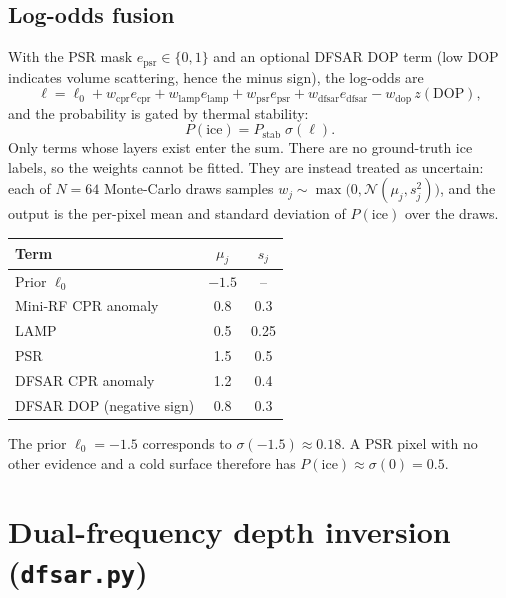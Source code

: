 \documentclass[11pt,a4paper]{article}
\newcommand{\code}[1]{\texttt{#1}}
\newcommand{\Pice}{P(\text{ice})}
\begin{document}
\subsection{Log-odds fusion}
With the PSR mask $e_{\mathrm{psr}}\in\{0,1\}$ and an optional DFSAR DOP term
(low DOP indicates volume scattering, hence the minus sign), the log-odds are
\begin{equation}
  \ell = \ell_0 + w_{\mathrm{cpr}}e_{\mathrm{cpr}} + w_{\mathrm{lamp}}e_{\mathrm{lamp}}
       + w_{\mathrm{psr}}e_{\mathrm{psr}} + w_{\mathrm{dfsar}}e_{\mathrm{dfsar}}
       - w_{\mathrm{dop}}\,z(\mathrm{DOP}),
\end{equation}
and the probability is gated by thermal stability:
\begin{equation}
  \Pice = P_{\mathrm{stab}}\;\sigma(\ell).
\end{equation}
Only terms whose layers exist enter the sum. There are no ground-truth ice labels, so the weights
cannot be fitted. They are instead treated as uncertain: each of $N=64$ Monte-Carlo draws samples
$w_j\sim\max\!\big(0,\mathcal{N}(\mu_j,s_j^2)\big)$, and the output is the per-pixel mean and
standard deviation of $\Pice$ over the draws.

\begin{center}
\begin{tabular}{@{}lcc@{}}
\toprule
Term & $\mu_j$ & $s_j$ \\
\midrule
Prior $\ell_0$ & $-1.5$ & -- \\
Mini-RF CPR anomaly & 0.8 & 0.3 \\
LAMP & 0.5 & 0.25 \\
PSR & 1.5 & 0.5 \\
DFSAR CPR anomaly & 1.2 & 0.4 \\
DFSAR DOP (negative sign) & 0.8 & 0.3 \\
\bottomrule
\end{tabular}
\end{center}

The prior $\ell_0=-1.5$ corresponds to $\sigma(-1.5)\approx0.18$. A PSR pixel with no other
evidence and a cold surface therefore has $\Pice\approx\sigma(0)=0.5$.

\section{Dual-frequency depth inversion (\code{dfsar.py})}
\end{document}
